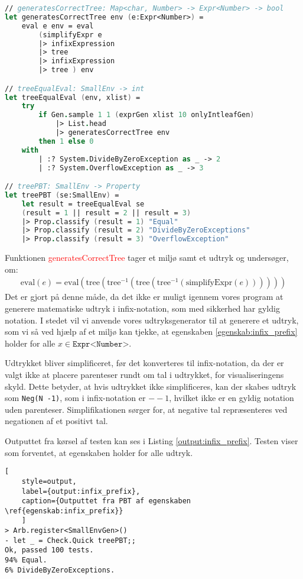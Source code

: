 \begin{lstlisting}[language={FSharp}, caption={PBT af egenskaben \ref{egenskab:infix_prefix}}, label={pbt:infix_prefix}]
// generatesCorrectTree: Map<char, Number> -> Expr<Number> -> bool
let generatesCorrectTree env (e:Expr<Number>) =
    eval e env = eval 
        (simplifyExpr e 
        |> infixExpression 
        |> tree 
        |> infixExpression 
        |> tree ) env

// treeEqualEval: SmallEnv -> int
let treeEqualEval (env, xlist) =
    try 
        if Gen.sample 1 1 (exprGen xlist 10 onlyIntleafGen) 
            |> List.head 
            |> generatesCorrectTree env 
        then 1 else 0
    with
        | :? System.DivideByZeroException as _ -> 2
        | :? System.OverflowException as _ -> 3

// treePBT: SmallEnv -> Property
let treePBT (se:SmallEnv) =
    let result = treeEqualEval se
    (result = 1 || result = 2 || result = 3)
    |> Prop.classify (result = 1) "Equal"
    |> Prop.classify (result = 2) "DivideByZeroExceptions"
    |> Prop.classify (result = 3) "OverflowException"
\end{lstlisting}

Funktionen \textcolor{red}{generatesCorrectTree} tager et miljø samt et udtryk og undersøger, om:
\begin{gather}
    \text{eval}(e) = \text{eval}(\text{tree}(\text{tree}^{-1}(\text{tree}(\text{tree}^{-1}(\text{simplifyExpr}(e))))))
\end{gather}
Det er gjort på denne måde, da det ikke er muligt igennem vores program at generere matematiske udtryk i infix-notation, som med sikkerhed har gyldig notation. I stedet vil vi anvende vores udtryksgenerator til at generere et udtryk, som vi så ved hjælp af et miljø kan tjekke, at egenskaben \ref{egenskab:infix_prefix} holder for alle \( x \in \texttt{Expr<Number>} \). 

Udtrykket bliver simplificeret, før det konverteres til infix-notation, da der er valgt ikke at placere parenteser rundt om tal i udtrykket, for visualiseringens skyld. Dette betyder, at hvis udtrykket ikke simplificeres, kan der skabes udtryk som \texttt{Neg(N -1)}, som i infix-notation er \(--1\), hvilket ikke er en gyldig notation uden parenteser. Simplifikationen sørger for, at negative tal repræsenteres ved negationen af et positivt tal.
 

Outputtet fra kørsel af testen kan ses i Listing \ref{output:infix_prefix}. Testen viser som forventet, at egenskaben holder for alle udtryk.
\begin{lstlisting}[
    style=output, 
    label={output:infix_prefix}, 
    caption={Outputtet fra PBT af egenskaben \ref{egenskab:infix_prefix}}
    ]
> Arb.register<SmallEnvGen>()                               
- let _ = Check.Quick treePBT;;
Ok, passed 100 tests.
94% Equal.
6% DivideByZeroExceptions.
\end{lstlisting}


